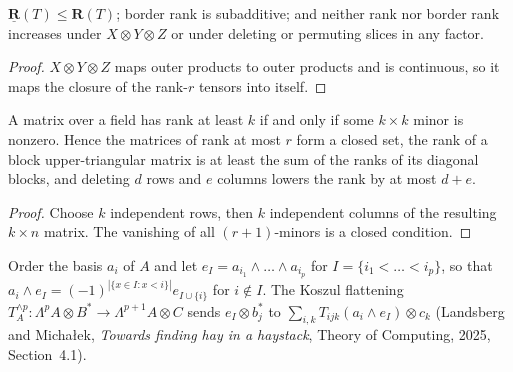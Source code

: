 \begin{lemma}
  \label{lem:frontiers-border-rank-basic}
  \leanok
  $\underline{\mathbf{R}}(T) \le \mathbf{R}(T)$; border rank is subadditive; and neither
  rank nor border rank increases under $X \otimes Y \otimes Z$ or under deleting or
  permuting slices in any factor.
\end{lemma}
\begin{proof}
  \leanok
  $X \otimes Y \otimes Z$ maps outer products to outer products and is continuous, so it
  maps the closure of the rank-$r$ tensors into itself.
\end{proof}

\begin{lemma}
  \label{lem:frontiers-rank-minors}
  \leanok
  A matrix over a field has rank at least $k$ if and only if some $k \times k$ minor is
  nonzero. Hence the matrices of rank at most $r$ form a closed set, the rank of a block
  upper-triangular matrix is at least the sum of the ranks of its diagonal blocks, and
  deleting $d$ rows and $e$ columns lowers the rank by at most $d + e$.
\end{lemma}
\begin{proof}
  \leanok
  Choose $k$ independent rows, then $k$ independent columns of the resulting
  $k \times n$ matrix. The vanishing of all $(r+1)$-minors is a closed condition.
\end{proof}

\begin{definition}
  \label{def:frontiers-koszul-flattening}
  \leanok
  Order the basis $a_i$ of $A$ and let $e_I = a_{i_1} \wedge \dots \wedge a_{i_p}$ for
  $I = \{i_1 < \dots < i_p\}$, so that
  $a_i \wedge e_I = (-1)^{|\{x \in I : x < i\}|} e_{I \cup \{i\}}$ for $i \notin I$. The
  Koszul flattening $T_A^{\wedge p} \colon \Lambda^p A \otimes B^* \to
  \Lambda^{p+1} A \otimes C$ sends $e_I \otimes b_j^*$ to
  $\sum_{i,k} T_{ijk} (a_i \wedge e_I) \otimes c_k$ (Landsberg and Micha{\l}ek,
  \emph{Towards finding hay in a haystack}, Theory of Computing, 2025, Section~4.1).
\end{definition}

